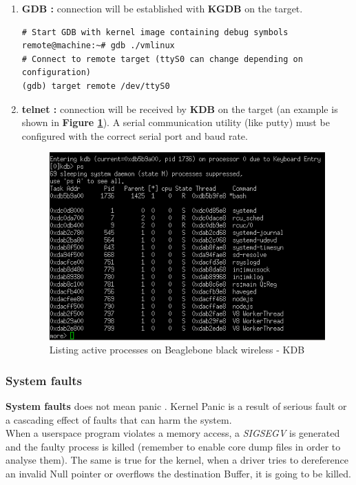 \begin{enumerate}
	\item \textbf{GDB : } connection will be established with \textbf{KGDB} on the target.
\begin{lstlisting}[style=BashInputStyle]
# Start GDB with kernel image containing debug symbols 
remote@machine:~# gdb ./vmlinux 
# Connect to remote target (ttyS0 can change depending on configuration)
(gdb) target remote /dev/ttyS0
\end{lstlisting}	
	
	
	\item \textbf{telnet : } connection will be received by \textbf{KDB} on the target (an example is shown in \textbf{Figure \ref{Debugging Beaglebone black wireless using KDB}}).
	A serial communication utility (like putty) must be configured with the correct serial port and baud rate.
	\begin{figure}[H]
		\centering
        \includegraphics[scale=0.45]{img/solution/kdb-beagle-bone-black.png}
        \caption{Listing active processes on Beaglebone black wireless - KDB}
        \label{Debugging Beaglebone black wireless using KDB}
\end{figure}
	
	
\end{enumerate}

\subsubsection{System faults}
\textbf{System faults} does not mean \og panic \fg. Kernel Panic is a result of serious fault or a cascading effect of faults that can harm the system.\\
When a userspace program violates a memory access, a \emph{SIGSEGV} is generated and the faulty process is killed (remember to enable core dump files in order to analyse them). The same is true for the kernel, when a driver tries to dereference an invalid Null pointer or overflows the destination Buffer, it is going to be killed.\\


